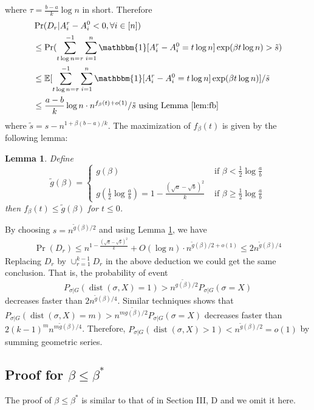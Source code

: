 \documentclass[conference]{IEEEtran}
\newtheorem{lemma}{Lemma}
\DeclareMathOperator{\dist}{dist}
\begin{document}
where $\tau =\frac{b-a}{k}\log n$ in short. Therefore
\begin{align*}
&\Pr(D_r | A_i^r - A_i^0  < 0, \forall i\in [n])  \\
&\leq\Pr(\sum_{t\log n =\tau}^{-1}\sum_{i=1}^n \mathbbm{1}[A^r_i - A^0_i = t\log n]\exp ( \beta  t\log n)  > \tilde{s} ) \\
& \leq \mathbb{E}[\sum_{t\log n =\tau}^{-1}\sum_{i=1}^n \mathbbm{1}[A^r_i - A^0_i= t\log n]\exp ( \beta  t\log n)] /  \tilde{s} \\
& \leq \frac{a-b}{k}\log n \cdot n^{f_{\beta}(t) + o(1)} / \tilde{s} \textrm{ using Lemma \ref{lem:fb} }
\end{align*}
where $\tilde{s} = s - n^{1+\beta(b-a)/k}$. 
The maximization of $f_{\beta}(t)$ is given by the following lemma:
\begin{lemma}\label{lem:tilde_g}
Define
$$
\tilde{g}(\beta) = \begin{cases}
g(\beta)   & \text{~if~} \beta< \frac{1}{2}\log\frac{a}{b} \\
g(\frac{1}{2} \log\frac{a}{b}) = 1 - \frac{(\sqrt{a}-\sqrt{b})^2}{k} & \text{~if~} \beta\ge \frac{1}{2}\log\frac{a}{b}
\end{cases}
$$
then $f_{\beta}(t) \leq \tilde{g}(\beta)$ for $t\leq 0$.
\end{lemma}
By choosing $s = n^{\tilde{g}(\beta)/2}$ and using Lemma \ref{lem:tilde_g}, we have
\begin{align*}
\Pr( D_r) \leq  n^{1-\frac{(\sqrt{a}-\sqrt{b})^2}{k}} + O(\log n)  \cdot n^{\tilde{g}(\beta)/2 + o(1)} \leq 2n^{\tilde{g}(\beta)/4}
\end{align*}
Replacing $D_r$ by $\cup_{r=1}^{k-1} D_r$ in the above deduction we could get the same conclusion.
That is, the probability of event
$$
P_{\sigma | G}(\dist(\sigma, X) = 1) > n^{\tilde{g(\beta)}/2}P_{\sigma | G}(\sigma = X)\label{eq:betastar_xx}
$$
decreases faster than $2n^{\tilde{g}(\beta)/4}$.
Similar techniques shows that $P_{\sigma | G}(\dist(\sigma, X) = m)> n^{m\tilde{g(\beta)}/2}P_{\sigma | G}(\sigma = X)$
decreases faster than $2(k-1)^m n^{m\tilde{g}(\beta)/4}$. Therefore, $P_{\sigma | G}(\dist(\sigma, X) > 1) < n^{\tilde{g}(\beta)/2} = o(1)$ by summing geometric series.

\subsection{Proof for $\beta\le\beta^\ast$}\label{subsect:smaller}
The proof of $\beta\le\beta^\ast$ is similar to that of \cite{ye2020exact} in Section III, D and we omit it here.
\end{document}
